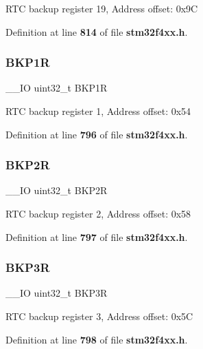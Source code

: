 R\+TC backup register 19, Address offset\+: 0x9C 

Definition at line \textbf{ 814} of file \textbf{ stm32f4xx.\+h}.

\mbox{\label{structRTC__TypeDef_af85290529fb82acef7c9fcea3718346c}} 
\subsubsection{B\+K\+P1R}
{\footnotesize\ttfamily \+\_\+\+\_\+\+IO uint32\+\_\+t B\+K\+P1R}

R\+TC backup register 1, Address offset\+: 0x54 

Definition at line \textbf{ 796} of file \textbf{ stm32f4xx.\+h}.

\mbox{\label{structRTC__TypeDef_aaa251a80daa57ad0bd7db75cb3b9cdec}} 
\subsubsection{B\+K\+P2R}
{\footnotesize\ttfamily \+\_\+\+\_\+\+IO uint32\+\_\+t B\+K\+P2R}

R\+TC backup register 2, Address offset\+: 0x58 

Definition at line \textbf{ 797} of file \textbf{ stm32f4xx.\+h}.

\mbox{\label{structRTC__TypeDef_a0b1eeda834c3cfd4d2c67f242f7b2a1c}} 
\subsubsection{B\+K\+P3R}
{\footnotesize\ttfamily \+\_\+\+\_\+\+IO uint32\+\_\+t B\+K\+P3R}

R\+TC backup register 3, Address offset\+: 0x5C 

Definition at line \textbf{ 798} of file \textbf{ stm32f4xx.\+h}.

\mbox{\label{structRTC__TypeDef_ab13e106cc2eca92d1f4022df3bfdbcd7}} 
